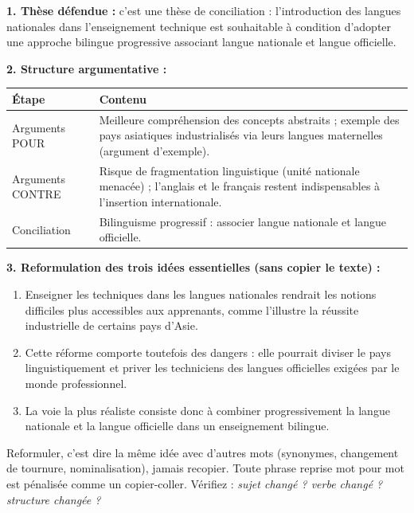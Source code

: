 \documentclass[11pt]{article}
\newcommand{\cle}[1]{{\popxbold\color{popdark}#1}}
\begin{document}
\begin{corrige}
\textbf{1. Thèse défendue :} c'est une thèse de \cle{conciliation} : l'introduction des langues nationales dans l'enseignement technique est souhaitable à condition d'adopter une approche bilingue progressive associant langue nationale et langue officielle.

\textbf{2. Structure argumentative :}

\begin{center}
\begin{tabularx}{\linewidth}{|l|X|}\hline
\rowcolor{popblueL} \textbf{Étape} & \textbf{Contenu} \\ \hline
Arguments POUR & Meilleure compréhension des concepts abstraits ; exemple des pays asiatiques industrialisés via leurs langues maternelles (argument d'exemple). \\ \hline
Arguments CONTRE & Risque de fragmentation linguistique (unité nationale menacée) ; l'anglais et le français restent indispensables à l'insertion internationale. \\ \hline
Conciliation & Bilinguisme progressif : associer langue nationale et langue officielle. \\ \hline
\end{tabularx}
\end{center}

\textbf{3. Reformulation des trois idées essentielles (sans copier le texte) :}
\begin{enumerate}
    \item Enseigner les techniques dans les langues nationales rendrait les notions difficiles plus accessibles aux apprenants, comme l'illustre la réussite industrielle de certains pays d'Asie.
    \item Cette réforme comporte toutefois des dangers : elle pourrait diviser le pays linguistiquement et priver les techniciens des langues officielles exigées par le monde professionnel.
    \item La voie la plus réaliste consiste donc à combiner progressivement la langue nationale et la langue officielle dans un enseignement bilingue.
\end{enumerate}
\end{corrige}

\begin{attention}
Reformuler, c'est dire la même idée avec d'autres mots (synonymes, changement de tournure, nominalisation), jamais recopier. Toute phrase reprise mot pour mot est pénalisée comme un copier-coller. Vérifiez : \emph{sujet changé ? verbe changé ? structure changée ?}
\end{attention}
\end{document}
